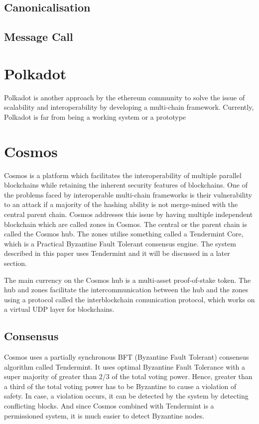 \documentclass[a4paper,twoside,phd]{BYUPhys}
\begin{document}
\subsection{Canonicalisation}

\subsection{Message Call}

\section{Polkadot}
Polkadot is another approach by the ethereum community to solve the issue of scalability and interoperability by developing a multi-chain framework. Currently, Polkadot is far from being a working system or a prototype 
\section{Cosmos}
Cosmos is a platform which facilitates the interoperability of multiple parallel blockchains while retaining the inherent security features of blockchains. One of the problems faced by interoperable multi-chain frameworks is their vulnerability to an attack if a majority of the hashing ability is not merge-mined with the central parent chain. Cosmos addresses this issue by having multiple independent blockchain which are called zones in Cosmos. The central or the parent chain is called the Cosmos hub. The zones utilise something called a Tendermint Core, which is a Practical Byzantine Fault Tolerant consensus engine. The system described in this paper uses Tendermint and it will be discussed in a later section.

The main currency on the Cosmos hub is a multi-asset proof-of-stake token. The hub and zones facilitate the intercommunication between the hub and the zones using a protocol called the interblockchain comunication protocol, which works on a virtual UDP layer for blockchains.

\subsection{Consensus}
Cosmos uses a partially synchronous BFT (Byzantine Fault Tolerant) consensus algorithm called Tendermint. It uses optimal Byzantine Fault Tolerance with a super majority of greater than 2/3 of the total voting power. Hence, greater than a third of the total voting power has to be Byzantine to cause a violation of safety. In case, a violation occurs, it can be detected by the system by detecting conflicting blocks. And since Cosmos combined with Tendermint is a permissioned system, it is much easier to detect Byzantine nodes.
\end{document}
